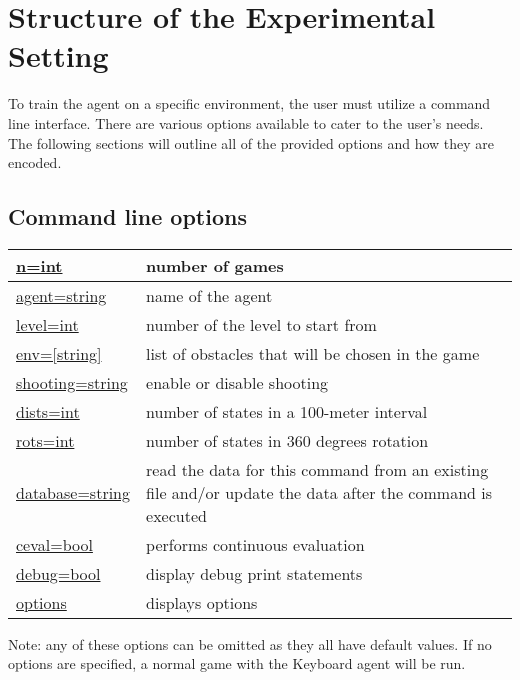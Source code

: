 \chapter{Structure of the Experimental Setting}
\label{agent_code_chapter}
To train the agent on a specific environment, the user must utilize a command line interface. There are various options available to cater to the user's needs. The following sections will outline all of the provided options and how they are encoded.

\section{Command line options}
\label{commOpt}
\begin{center}
\begin{tabular}{ | p{4cm}|p{10cm} | } 
  \hline
  \hyperref[opt:n]{n=int} & number of games\\ 
  \hline
  \hyperref[opt:agent]{agent=string} & name of the agent\\ 
  \hline
  \hyperref[opt:level]{level=int} & number of the level to start from \\ 
  \hline
  \hyperref[opt:env]{env=[string]} & list of obstacles that will be chosen in the game \\ 
  \hline
  \hyperref[opt:shooting]{shooting=string} & enable or disable shooting  \\ 
  \hline
  \hyperref[opt:dists]{dists=int} & number of states in a 100-meter interval \\ 
  \hline
  \hyperref[opt:rots]{rots=int} & number of states in 360 degrees rotation \\ 
  \hline
  \hyperref[opt:database]{database=string} & read the data for this command from an existing file and/or update the data after the command is executed  \\ 
  \hline
  \hyperref[opt:ceval]{ceval=bool} & performs continuous evaluation \\ 
  \hline
  \hyperref[opt:debug]{debug=bool} & display debug print statements \\ 
  \hline
  \hyperref[opt:options]{options} & displays options \\ 
  \hline
\end{tabular}
\end{center}
Note: any of these options can be omitted as they all have default values. If no options are specified, a normal game with the Keyboard agent will be run.
